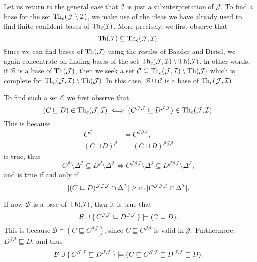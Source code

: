 Let us return to the general case that $\mathcal{I}$ is just a subinterpretation of
$\mathcal{J}$.  To find a base for the set $\operatorname{Th}_{c}(\mathcal{J} \setminus \mathcal{I})$,
we make use of the ideas we have already used to find finite confident bases of
$\operatorname{Th}_{c}(\mathcal{I})$.  More precisely, we first observe that
\begin{equation*}
  \operatorname{Th}(\mathcal{J}) \subseteq \operatorname{Th}_{c}(\mathcal{J}, \mathcal{I}).
\end{equation*}
Since we can find bases of $\operatorname{Th}(\mathcal{J})$ using the results of Baader and Distel, we
again concentrate on finding bases of the set $\operatorname{Th}_{c}(\mathcal{J}, \mathcal{I}) \setminus
\operatorname{Th}(\mathcal{J})$.  In other words, if $\mathcal{B}$ is a base of $\operatorname{Th}(\mathcal{J})$, then
we seek a set $\mathcal{C} \subseteq \operatorname{Th}_{c}(\mathcal{J}, \mathcal{I}) \setminus
\operatorname{Th}(\mathcal{J})$ which is complete for $\operatorname{Th}_{c}(\mathcal{J}, \mathcal{I}) \setminus
\operatorname{Th}(\mathcal{J})$.  In this case, $\mathcal{B} \cup \mathcal{C}$ is a base of
$\operatorname{Th}_{c}(\mathcal{J}, \mathcal{I})$.

To find such a set $\mathcal{C}$ we first observe that
\begin{equation*}
  (C \sqsubseteq D) \in \operatorname{Th}_{c}(\mathcal{J}, \mathcal{I}) \iff (C^{\mathcal{J}\mathcal{J}}
  \sqsubseteq D^{\mathcal{J}\mathcal{J}}) \in \operatorname{Th}_{c}(\mathcal{J}, \mathcal{I}).
\end{equation*}
This is because
\begin{align*}
  C^{\mathcal{J}} &= C^{\mathcal{J}\mathcal{J}\mathcal{J}},\\
  (C \sqcap D)^{\mathcal{J}} &= (C \sqcap D)^{\mathcal{J}\mathcal{J}\mathcal{J}}
\end{align*}
is true, thus
\begin{equation*}
  C^{\mathcal{J}} \setminus \Delta^{\mathcal{I}} \subseteq D^{\mathcal{J}} \setminus
  \Delta^{\mathcal{I}} \iff C^{\mathcal{J}\mathcal{J}\mathcal{J}} \setminus
  \Delta^{\mathcal{I}} \subseteq D^{\mathcal{J}\mathcal{J}\mathcal{J}} \setminus \Delta^{\mathcal{I}},
\end{equation*}
and  is true if and only if
\begin{equation*}
  \lvert (C \sqsubseteq D)^{\mathcal{J}\mathcal{J}\mathcal{J}} \cap \Delta^{\mathcal{I}} \rvert
  \ge c \cdot \lvert C^{\mathcal{J}\mathcal{J}\mathcal{J}} \cap \Delta^{\mathcal{I}} \rvert.
\end{equation*}

If now $\mathcal{B}$ is a base of $\operatorname{Th}(\mathcal{J})$, then it is true that
\begin{equation*}
  \mathcal{B} \cup {\ensuremath{\{\, C^{\mathcal{J}\mathcal{J}} \sqsubseteq D^{\mathcal{J}\mathcal{J}}
  \,\}}} \models (C \sqsubseteq D).
\end{equation*}
This is because $\mathcal{B} \models (C \sqsubseteq C^{\mathcal{J}\mathcal{J}})$, since $C
\sqsubseteq C^{\mathcal{J}\mathcal{J}}$ is valid in $\mathcal{J}$.  Furthermore,
$D^{\mathcal{J}\mathcal{J}} \sqsubseteq D$, and thus
\begin{equation*}
  \mathcal{B} \cup {\ensuremath{\{\, C^{\mathcal{J}\mathcal{J}} \sqsubseteq D^{\mathcal{J}\mathcal{J}}
  \,\}}} \models (C \sqsubseteq C^{\mathcal{J}\mathcal{J}} \sqsubseteq
  D^{\mathcal{J}\mathcal{J}} \sqsubseteq D).
\end{equation*}

